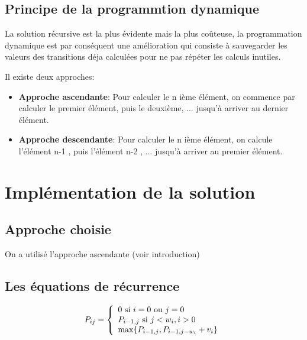 \documentclass[12pt]{report}
\begin{document}
	\section{Principe de la programmtion dynamique}
	La solution récursive est la plus évidente mais la plus coûteuse, la programmation dynamique est par conséquent une amélioration qui consiste à sauvegarder les valeurs des transitions déja calculées pour ne pas répéter les calculs inutiles.
	\par{}
	Il existe deux approches:
	\begin{itemize}
		\item \textbf {Approche ascendante}:
		Pour calculer le n ième élément, on commence par calculer le premier élément, puis le deuxième, ... jusqu'à arriver au dernier élément.
		\item \textbf {Approche descendante}:
		Pour calculer le n ième élément, on calcule l'élément n-1 , puis l'élément n-2 , ... jusqu'à arriver au premier élément.
		
	\end{itemize}	
	
	\chapter{Implémentation de la solution}
	\section{Approche choisie}
	On a utilisé l'approche ascendante (voir introduction)
	\section{Les équations de récurrence}
	\[
    P_{ij}=\left\{
                \begin{array}{ll}
                  0 $ si $ i=0$ ou $j=0\\
                  P_{i-1,j} $ si $ j<w_{i} , i>0\\
                  \max\lbrace P_{i-1,j}, P_{i-1,j-w_{i}}+v_{i} \rbrace
                \end{array}
              \right.
  \]
\end{document}
